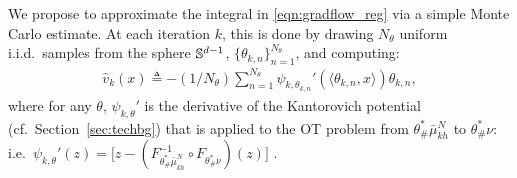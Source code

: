 We propose to approximate the integral in \eqref{eqn:gradflow_reg} via a simple Monte Carlo estimate.
At each iteration $k$, this is done by drawing $N_\theta$ uniform i.i.d.\ samples from the sphere $\mathbb{S}^{d-1}$, $\{\theta_{k,n}\}_{n=1}^{N_\theta}$, and computing:
%
\begin{align}
\hat{v}_k(x) \triangleq - (1/{N_\theta}) \sum\nolimits_{n=1}^{N_\theta} \psi_{k, \theta_{k,n}}'(\langle\theta_{k,n},x\rangle ) \theta_{k,n}, \label{eqn:approxdrift}
\end{align}
%
where for any $\theta$, $\psi_{k, \theta}'$ is the derivative of the Kantorovich potential (cf.\ Section~\ref{sec:techbg}) that is applied to the OT problem from $\theta^*_\#\bar{\mu}_{kh}^{N}$ to $\theta^*_\#\nu$: i.e.\, 
   $\psi_{k, \theta}'(z) = \bigl[ z - (F^{-1}_{\theta^*_\#\bar{\mu}_{kh}^{N}} \circ F_{\theta^*_\#\nu}) (z)  \bigr]$ .%

